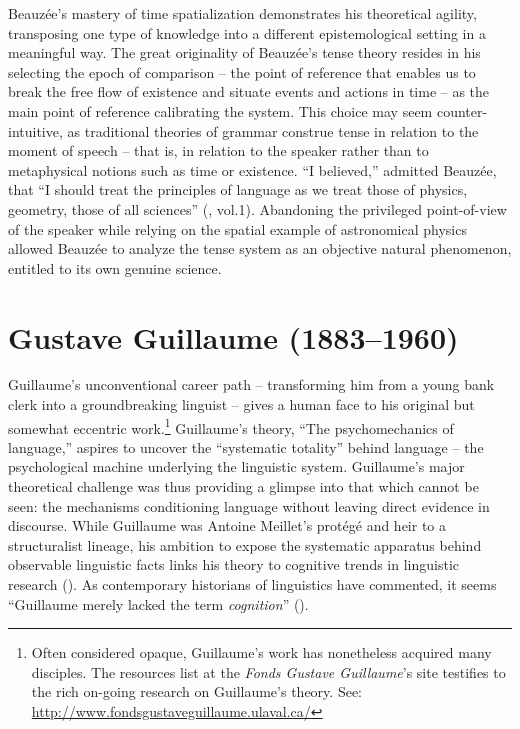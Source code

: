 \documentclass[output=paper]{langsci/langscibook}
\begin{document}
Beauzée’s mastery of time spatialization demonstrates his theoretical agility, transposing one type of knowledge into a different epistemological setting in a meaningful way. The great originality of Beauzée’s tense theory resides in his selecting the epoch of comparison -- the point of reference that enables us to break the free flow of existence and situate events and actions in time -- as the main point of reference calibrating the system. This choice may seem counter-intuitive, as traditional theories of grammar construe tense in relation to the moment of speech -- that is, in relation to the speaker rather than to metaphysical notions such as time or existence. “I believed,” admitted Beauzée, that “I should treat the principles of language as we treat those of physics, geometry, those of all sciences” (\citeyear[xvi]{beauzee_grammaire_1767}, vol.1). Abandoning the privileged point\nobreakdash-of\nobreakdash-view of the speaker while relying on the spatial example of astronomical physics allowed Beauzée to analyze the tense system as an objective natural phenomenon, entitled to its own genuine science.

\section{Gustave Guillaume (1883–1960)}

Guillaume’s unconventional career path -- transforming him from a young bank clerk into a groundbreaking linguist \citep{valin_histoire_1982} -- gives a human face to his original but somewhat eccentric work.\footnote{Often considered opaque, Guillaume’s work has nonetheless acquired many disciples. The resources list at the \textit{Fonds Gustave Guillaume}’s site testifies to the rich on-going research on Guillaume’s theory. See: \url{http://www.fondsgustaveguillaume.ulaval.ca/}}  Guillaume’s theory, “The psychomechanics of language,” aspires to uncover the “systematic totality” \citep[15]{guillaume_larchitectonique_1965} behind language -- the psychological machine underlying the linguistic system. Guillaume’s major theoretical challenge was thus providing a glimpse into that which cannot be seen: the mechanisms conditioning language without leaving direct evidence in discourse. While Guillaume was Antoine Meillet’s protégé and heir to a structuralist lineage, his ambition to expose the systematic apparatus behind observable linguistic facts links his theory to cognitive trends in linguistic research (\citealt{puech_mentalisme_1997}). As contemporary historians of linguistics have commented, it seems “Guillaume merely lacked the term \textit{cognition}” (\citealt[41]{bottineau_terminologie_2006}). 
\end{document}
